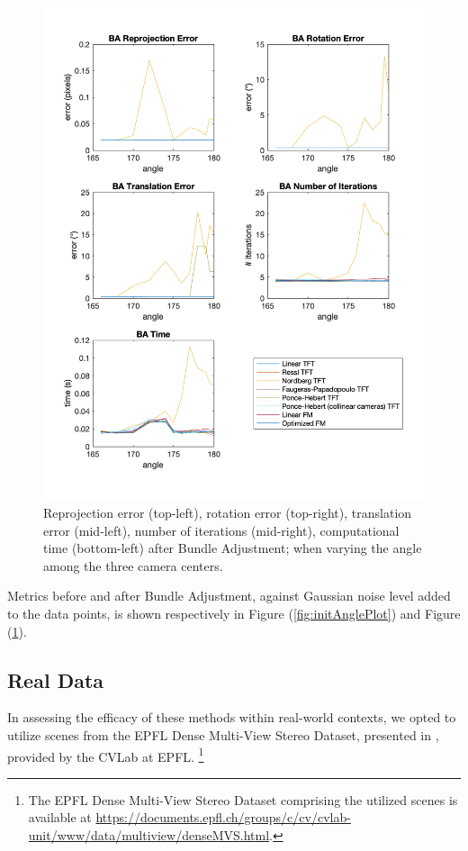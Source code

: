 \begin{figure}[p]
	\centering
	\includegraphics[width=1\textwidth]{Experiments/Synthetic/angle/BAanglePlots.png}
	\caption{Reprojection error (top-left), rotation error (top-right), translation error (mid-left), number of iterations (mid-right), computational time (bottom-left) after Bundle Adjustment; when varying the angle among the three camera centers.}
	\label{fig:BAAnglePlot}
\end{figure}

\pagebreak

Metrics before and after Bundle Adjustment, against Gaussian noise level added to the data points, is shown respectively in Figure (\ref{fig:initAnglePlot}) and Figure (\ref{fig:BAAnglePlot}).

\pagebreak

\subsection{Real Data}
In assessing the efficacy of these methods within real-world contexts, we opted to utilize scenes from the EPFL Dense Multi-View Stereo Dataset, presented in \cite{13-epfl-dataset}, provided by the CVLab at EPFL. \footnote{The EPFL Dense Multi-View Stereo Dataset comprising the utilized scenes is available at \href{https://documents.epfl.ch/groups/c/cv/cvlab-unit/www/data/multiview/denseMVS.html}{https://documents.epfl.ch/groups/c/cv/cvlab-unit/www/data/multiview/denseMVS.html}.}\\



